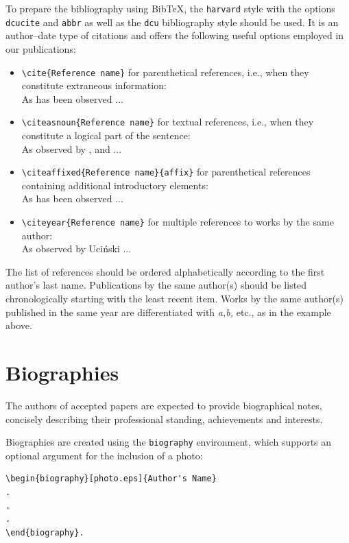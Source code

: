 \documentclass{amcs}
\begin{document}
To prepare the bibliography using Bib\TeX, the \verb+harvard+ style with the options \verb+dcucite+ and \verb+abbr+ as well as the \verb+dcu+ bibliography style should be used. It is an author--date type of citations and offers the following useful options employed in our publications:
\begin{itemize}
  \item \verb+\cite{Reference name}+ for parenthetical references, i.e., when they constitute extraneous information:\\[+1ex]
        As has been observed \cite{Haykin:99,Reinelt:02,Maryak:2001} ...
  \item \verb+\citeasnoun{Reference name}+ for textual references, i.e., when they constitute a logical part of the sentence:\\[+1ex]
        As observed by ,  and  ...
  \item \verb+\citeaffixed{Reference name}{affix}+ for parenthetical references containing additional introductory elements:\\[+1ex]
        As has been observed  ...
  \item \verb+\citeyear{Reference name}+ for multiple references to works by the same author:\\[+1ex]
        As observed by Uci\'nski \citeyear{Ucinski:99,Ucinski:05a,Ucinski:05b} ...
\end{itemize}

The list of references should be ordered alphabetically according to the first author's last name. Publications by the same author(s) should be listed chronologically starting with the least recent item. Works by the same author(s) published in the same year are differentiated with \emph{a,b,} etc., as in the example above.

\section{Biographies}
The authors of accepted papers are expected to provide biographical notes, concisely describing their professional standing, achievements and interests.

Biographies are created using the \texttt{biography}
environment, which supports an optional argument for
the inclusion of a photo:
{\small\begin{verbatim}
\begin{biography}[photo.eps]{Author's Name}
.
.
.
\end{biography}.
\end{verbatim}}
\end{document}
